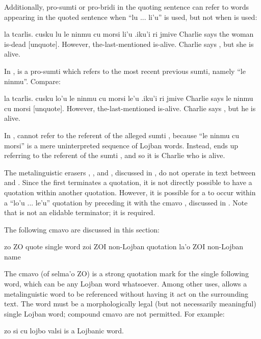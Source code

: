 Additionally, pro-sumti or pro-bridi in the quoting sentence
    can refer to words appearing in the quoted sentence when ``lu
    ... li'u'' is used, but not when  is used:
\begin{example}
la tcarlis. cusku lu le ninmu cu morsi li'u\n
\T	.iku'i ri jmive\n
Charlie says  the woman is-dead [unquote].\n
\T	However, the-last-mentioned is-alive.\n
Charlie says , but she is alive.
\end{example}

In ,  is a pro-sumti
    which refers to the most recent previous sumti, namely ``le
    ninmu''. Compare:
\begin{example}
la tcarlis. cusku lo'u le ninmu cu morsi le'u\n
\T	.iku'i ri jmive\n
Charlie says  le ninmu cu morsi [unquote].\n
\T	However, the-last-mentioned is-alive.\n
Charlie says , but he is alive.
\end{example}

In ,  cannot refer to the
    referent of the alleged sumti , because ``le ninmu
    cu morsi'' is a mere uninterpreted sequence of Lojban words.
    Instead,  ends up referring to the referent of the sumti
    , and so it is Charlie who is alive. 

The metalinguistic erasers , , and ,
    discussed in , do not operate in
    text between  and . Since the first 
    terminates a  quotation, it is not directly possible to
    have a  quotation within another  quotation.
    However, it is possible for a  to occur within a ``lo'u
    ... le'u'' quotation by preceding it with the cmavo ,
    discussed in . Note that 
    is not an elidable terminator; it is required.



The following cmavo are discussed in this section:

   zo  ZO  quote single word
    zoi ZOI non-Lojban quotation
    la'o    ZOI non-Lojban name

The cmavo  (of selma'o ZO) is a strong quotation mark for
    the single following word, which can be any Lojban word
    whatsoever. Among other uses,  allows a metalinguistic
    word to be referenced without having it act on the surrounding
    text. The word must be a morphologically legal (but not
    necessarily meaningful) single Lojban word; compound cmavo are
    not permitted. For example:
\begin{example}
zo si cu lojbo valsi\n
{} is a Lojbanic word.
\end{example}


